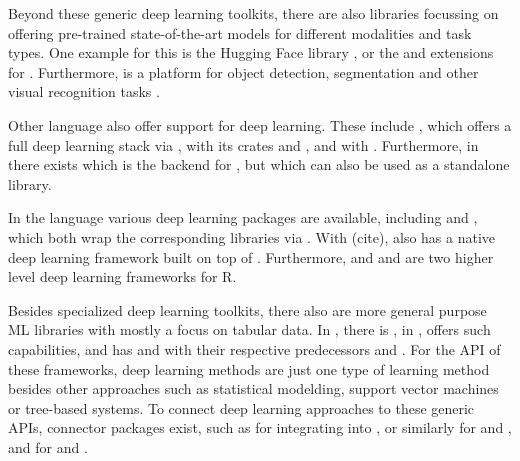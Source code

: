 \documentclass[article, nojss]{jss}
\theoremstyle{definition}
\begin{document}
Beyond these generic deep learning toolkits, there are also libraries focussing on offering pre-trained state-of-the-art models for different modalities and task types.
One example for this is the Hugging Face  library \citep{wolf-etal-2020-transformers}, or the  \citep{marcel2010torchvision} and  \citep{yang2022torchaudio} extensions for \pytorch.
Furthermore,  is a platform for object detection, segmentation and other visual recognition tasks \citep{wu2019detectron2}.

Other language also offer support for deep learning.
These include , which offers a full deep learning stack via \flux{} \citep{innes2018flux},  with its crates  \citep{burn} and  \citep{candle}, and  with  \citep{gomlx}.
Furthermore, in \proglang{\cpp{}} there exists  which is the \cpp backend for \pytorch{}, but which can also be used as a standalone \cpp{} library.

In the  language various deep learning packages are available, including  \citep{keras3} and  \citep{r-tensorflow}, which both wrap the corresponding \pytorch{} libraries via  \citep{reticulate}.
With  (cite),  also has a native deep learning framework built on top of .
Furthermore,  \citep{luz} and and  \citep{cito} are two higher level deep learning frameworks for R.

Besides specialized deep learning toolkits, there also are more general purpose ML libraries with mostly a focus on tabular data.
In \python, there is \sklearn{} \citep{pedregosa2011scikit}, in \julia{},  \mlj{} offers such capabilities, and \rlang{} has \tidymodels{} \citep{tidymodels} and  \citep{ref-mlr32019} with their respective predecessors  \citep{caret} and  \citep{bischl2016mlr}.
For the API of these frameworks, deep learning methods are just one type of learning method besides other approaches such as statistical modelding, support vector machines or tree-based systems.
To connect deep learning approaches to these generic APIs, connector packages exist, such as  \citep{tietz2017skorch} for integrating  into \sklearn{}, or similarly  \citep{MLJFlux} for \flux{} and \mlj, and  \citep{brulee} for \torch{} and \tidymodels.
\end{document}
